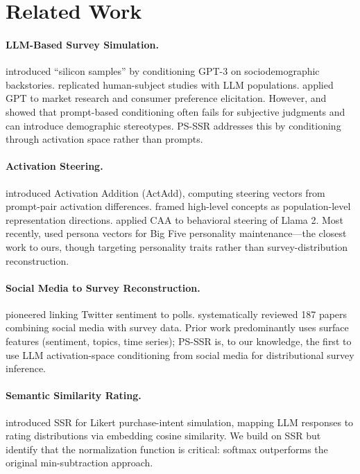 \documentclass[letterpaper]{article}
\newcommand{\method}{PS-SSR}
\begin{document}
\section{Related Work}
\label{sec:related}

\paragraph{LLM-Based Survey Simulation.}
\citet{argyle2023out} introduced ``silicon samples'' by conditioning GPT-3 on sociodemographic backstories. \citet{aher2023using} replicated human-subject studies with LLM populations. \citet{brand2024using} applied GPT to market research and consumer preference elicitation. However, \citet{santurkar2023whose} and \citet{sun2025sociodemographic} showed that prompt-based conditioning often fails for subjective judgments and can introduce demographic stereotypes. \method{} addresses this by conditioning through activation space rather than prompts.

\paragraph{Activation Steering.}
\citet{turner2024activation} introduced Activation Addition (ActAdd), computing steering vectors from prompt-pair activation differences. \citet{zou2023representation} framed high-level concepts as population-level representation directions. \citet{panickssery2024steering} applied CAA to behavioral steering of Llama 2. Most recently, \citet{jha2025steering} used persona vectors for Big Five personality maintenance---the closest work to ours, though targeting personality traits rather than survey-distribution reconstruction.

\paragraph{Social Media to Survey Reconstruction.}
\citet{oconnor2010tweets} pioneered linking Twitter sentiment to polls. \citet{reveilhac2022combining} systematically reviewed 187 papers combining social media with survey data. Prior work predominantly uses surface features (sentiment, topics, time series); \method{} is, to our knowledge, the first to use LLM activation-space conditioning from social media for distributional survey inference.

\paragraph{Semantic Similarity Rating.}
\citet{maier2025llms} introduced SSR for Likert purchase-intent simulation, mapping LLM responses to rating distributions via embedding cosine similarity. We build on SSR but identify that the normalization function is critical: softmax outperforms the original min-subtraction approach.
\end{document}
